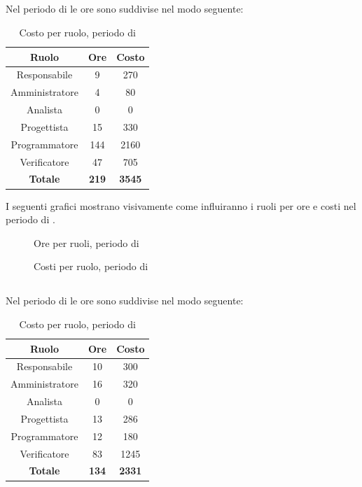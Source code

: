 \subsection{\Cod}
Nel periodo di \Cod{} le ore sono suddivise nel modo seguente:
\begin{table}[H]
	\centering
	\begin{tabular}{|c|c|c|}
		\hline
		\textbf{Ruolo} &
		\textbf{Ore} &
		\textbf{Costo} \\
		\hline
		Responsabile & 9 & 270 \\
		\hline
		Amministratore & 4 & 80 \\
		\hline
		Analista & 0 & 0\\
		\hline
		Progettista & 15 & 330 \\
		\hline
		Programmatore & 144 & 2160 \\
		\hline
		Verificatore & 47 & 705 \\
		\hline
		\textbf{Totale} & \textbf{219} & \textbf{3545} \\
		\hline
	\end{tabular}
	\caption{Costo per ruolo, periodo di \Cod}
\end{table}

I seguenti grafici mostrano visivamente come influiranno i ruoli per ore e costi nel periodo di \Cod.
\begin{figure}[H]
	\centering
	\caption{Ore per ruoli, periodo di \Cod}
\end{figure}
\begin{figure}[H]
	\centering
	\caption{Costi per ruolo, periodo di \Cod}
\end{figure}

\subsection{\VV}
Nel periodo di \VV{} le ore sono suddivise nel modo seguente:
\begin{table}[H]
	\centering
	\begin{tabular}{|c|c|c|}
		\hline
		\textbf{Ruolo} &
		\textbf{Ore} &
		\textbf{Costo} \\
		\hline
		Responsabile & 10 & 300\\
		\hline
		Amministratore & 16 & 320\\
		\hline
		Analista & 0 & 0\\
		\hline
		Progettista & 13 & 286 \\
		\hline
		Programmatore & 12 & 180 \\
		\hline
		Verificatore & 83 & 1245\\
		\hline
		\textbf{Totale} & \textbf{134} & \textbf{2331} \\
		\hline
	\end{tabular}
	\caption{Costo per ruolo, periodo di \VV}
\end{table}

